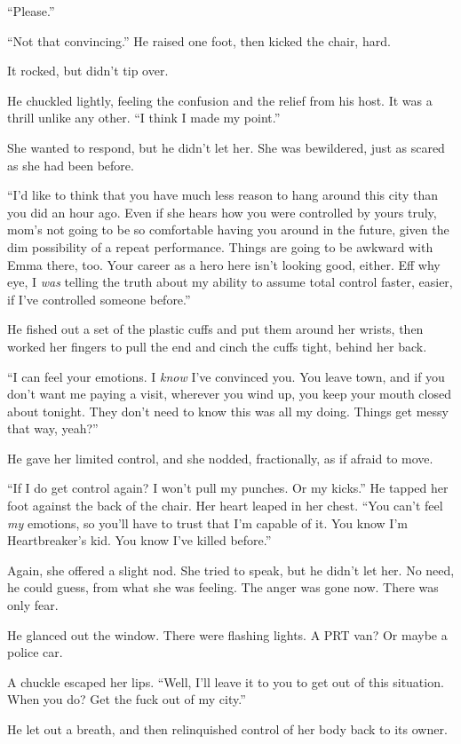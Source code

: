 ``Please.''



``Not that convincing.''  He raised one foot, then kicked the chair, hard.



It rocked, but didn't tip over.



He chuckled lightly, feeling the confusion and the relief from his host.  It was a thrill unlike any other.  ``I think I made my point.''



She wanted to respond, but he didn't let her.  She was bewildered, just as scared as she had been before.



``I'd like to think that you have much less reason to hang around this city than you did an hour ago.  Even if she hears how you were controlled by yours truly, mom's not going to be so comfortable having you around in the future, given the dim possibility of a repeat performance.  Things are going to be awkward with Emma there, too.  Your career as a hero here isn't looking good, either.  Eff why eye, I \emph{was} telling the truth about my ability to assume total control faster, easier, if I've controlled someone before.''



He fished out a set of the plastic cuffs and put them around her wrists, then worked her fingers to pull the end and cinch the cuffs tight, behind her back.



``I can feel your emotions.  I \emph{know} I've convinced you.  You leave town, and if you don't want me paying a visit, wherever you wind up, you keep your mouth closed about tonight.  They don't need to know this was all my doing.  Things get messy that way, yeah?''



He gave her limited control, and she nodded, fractionally, as if afraid to move.



``If I do get control again?  I won't pull my punches.  Or my kicks.''  He tapped her foot against the back of the chair.  Her heart leaped in her chest.  ``You can't feel \emph{my }emotions, so you'll have to trust that I'm capable of it.  You know I'm Heartbreaker's kid.  You know I've killed before.''



Again, she offered a slight nod.  She tried to speak, but he didn't let her.  No need, he could guess, from what she was feeling.  The anger was gone now.  There was only fear.



He glanced out the window.  There were flashing lights.  A PRT van?  Or maybe a police car.



A chuckle escaped her lips.  ``Well, I'll leave it to you to get out of this situation.  When you do?  Get the fuck out of my city.''



He let out a breath, and then relinquished control of her body back to its owner.

